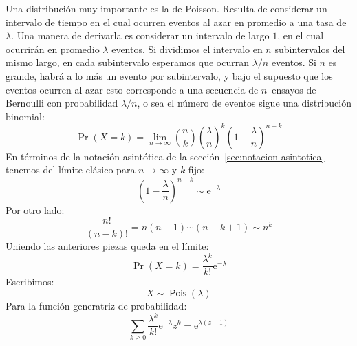   Una distribución muy importante es la de Poisson.%
  Resulta de considerar un intervalo de tiempo
  en el cual ocurren eventos al azar
  en promedio a una tasa de \(\lambda\).
  Una manera de derivarla es considerar un intervalo de largo \(1\),
  en el cual ocurrirán en promedio \(\lambda\) eventos.
  Si dividimos el intervalo en \(n\) subintervalos del mismo largo,
  en cada subintervalo
  esperamos que ocurran \(\lambda / n\) eventos.
  Si \(n\) es grande,
  habrá a lo más un evento por subintervalo,
  y bajo el supuesto que los eventos ocurren al azar
  esto corresponde a una secuencia de \(n\)~ensayos de Bernoulli%
  con probabilidad \(\lambda / n\),
  o sea el número de eventos sigue una distribución binomial:%
  \begin{equation*}
    \Pr(X = k)
      = \lim_{n \rightarrow \infty}
	  \binom{n}{k}
	    \left( \frac{\lambda}{n} \right)^k
	    \left( 1 - \frac{\lambda}{n} \right)^{n - k}
  \end{equation*}
  En términos de la notación asintótica
  de la sección~\ref{sec:notacion-asintotica}%
  tenemos del límite clásico para \(n \rightarrow \infty\)
  y \(k\) fijo:
  \begin{equation*}
    \left( 1 - \frac{\lambda}{n} \right)^{n - k}
      \sim \mathrm{e}^{- \lambda}
  \end{equation*}
  Por otro lado:
  \begin{equation*}
    \frac{n!}{(n - k)!}
      = n (n - 1) \dotsm (n - k + 1)
      \sim n^{\underline{k}}
  \end{equation*}
  Uniendo las anteriores piezas queda en el límite:
  \begin{equation}
    \label{eq:Pois-distribution}
    \Pr(X = k)
      = \frac{\lambda^k}{k!} \mathrm{e}^{- \lambda}
  \end{equation}
  Escribimos:
  \begin{equation}
    \label{eq:distributed-Pois}
    X \sim \operatorname{\boldsymbol{\mathsf{Pois}}}(\lambda)
  \end{equation}
  Para la función generatriz de probabilidad:
  \begin{equation}
    \label{eq:PGF-Pois}
    \sum_{k \ge 0} \frac{\lambda^k}{k!} \mathrm{e}^{- \lambda} z^k
      = \mathrm{e}^{\lambda (z - 1)}
  \end{equation}

